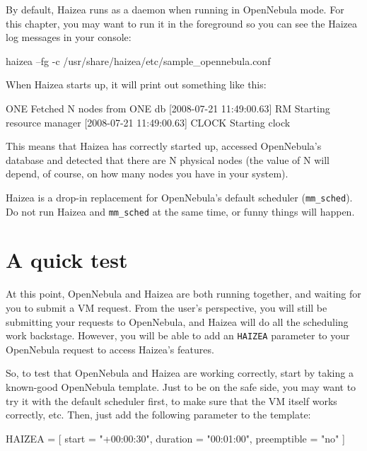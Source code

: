 By default, Haizea runs as a daemon when running in OpenNebula mode. For this chapter, you may want to run it in the foreground so you can see the Haizea log messages in your console:

\begin{wideshellverbatim}
haizea --fg -c /usr/share/haizea/etc/sample_opennebula.conf
\end{wideshellverbatim}

When Haizea starts up, it will print out something like this:

\begin{wideshellverbatim}
[2008-07-21 11:49:00.63] ONE     Fetched N nodes from ONE db
[2008-07-21 11:49:00.63] RM      Starting resource manager
[2008-07-21 11:49:00.63] CLOCK   Starting clock
\end{wideshellverbatim}

This means that Haizea has correctly started up, accessed OpenNebula's database and detected that there are N physical nodes (the value of N will depend, of course, on how many nodes you have in your system).

\begin{warning}
Haizea is a drop-in replacement for OpenNebula's default scheduler (\texttt{mm\_sched}). Do not run Haizea and \texttt{mm\_sched} at the same time, or funny things will happen.
\end{warning}

\section{A quick test}

At this point, OpenNebula and Haizea are both running together, and waiting for you to submit a VM request. From the user's perspective, you will still be submitting your requests to OpenNebula, and Haizea will do all the scheduling work backstage. However, you will be able to add an \texttt{HAIZEA} parameter to your OpenNebula request to access Haizea's features.

So, to test that OpenNebula and Haizea are working correctly, start by taking a known-good OpenNebula template. Just to be on the safe side, you may want to try it with the default scheduler first, to make sure that the VM itself works correctly, etc. Then, just add the following parameter to the template:

\begin{wideshellverbatim}
HAIZEA = [
  start        = "+00:00:30",
  duration     = "00:01:00",
  preemptible  = "no"
]
\end{wideshellverbatim}

